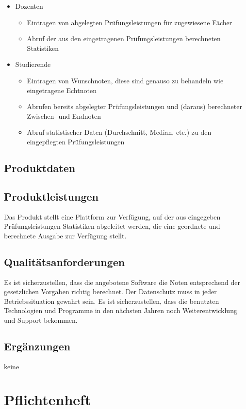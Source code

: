 \documentclass[12pt,a4paper,parskip]{scrreprt}
\begin{document}
\begin{itemize}
\begin{itemize}
\begin{itemize}
\end{itemize}
\item Dozenten
\begin{itemize}
\item Eintragen von abgelegten Prüfungsleistungen für zugewiesene Fächer
\item Abruf der aus den eingetragenen Prüfungsleistungen berechneten Statistiken
\end{itemize}
\item Studierende
\begin{itemize}
\item Eintragen von Wunschnoten, diese sind genauso zu behandeln wie eingetragene \glqq Echtnoten\grqq
\item Abrufen bereits abgelegter Prüfungsleistungen und (daraus) berechneter Zwischen- und Endnoten
\item Abruf statistischer Daten (Durchschnitt, Median, etc.) zu den eingepflegten Prüfungsleistungen
\end{itemize}
\end{itemize}
\end{itemize}
\subsection{Produktdaten}
\subsection{Produktleistungen}
Das Produkt stellt eine Plattform zur Verfügung, auf der aus eingegeben Prüfungsleistungen Statistiken abgeleitet werden, die eine geordnete und berechnete Ausgabe zur Verfügung stellt.
\subsection{Qualitätsanforderungen}
Es ist sicherzustellen, dass die angebotene Software die Noten entsprechend der gesetzlichen Vorgaben richtig berechnet. Der Datenschutz muss in jeder Betriebssituation gewahrt sein.
Es ist sicherzustellen, dass die benutzten Technologien und Programme in den nächsten Jahren noch Weiterentwicklung und Support bekommen.
\subsection{Ergänzungen}
keine
\section{Pflichtenheft}
\end{document}
